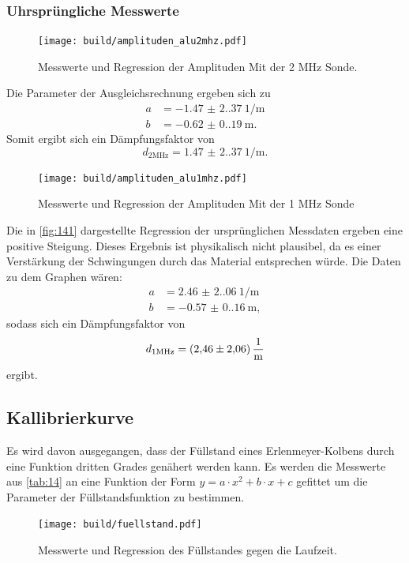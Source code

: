 \subsubsection{Uhrsprüngliche Messwerte}
\begin{figure}[H]
    \centering
    \caption{Messwerte und Regression der Amplituden Mit der 2 $\unit{\mega\hertz}$ Sonde.}
    \label{fig:131}
    \texttt{[image: build/amplituden\_alu2mhz.pdf]}
\end{figure}
\noindent Die Parameter der Ausgleichsrechnung ergeben sich zu 
\begin{align*}
    a &= \qty{-1.47(2.37)}{1 \per\meter}\\
    b &= \qty{-0.62(0.19)}{\meter}.
\end{align*}
Somit ergibt sich ein Dämpfungsfaktor von 
\begin{equation}
    d_{2 \unit{\mega\hertz}} = \qty{1.47(2.37)}{1 \per\meter}.
\end{equation}

\begin{figure}[H]
    \centering
    \caption{Messwerte und Regression der Amplituden Mit der 1 $\unit{\mega\hertz}$ Sonde }
    \label{fig:141}
    \texttt{[image: build/amplituden\_alu1mhz.pdf]}
\end{figure}
\noindent Die in \autoref{fig:141} dargestellte Regression
der ursprünglichen Messdaten ergeben eine positive Steigung. Dieses Ergebnis
ist physikalisch nicht plausibel, da es einer Verstärkung der Schwingungen
durch das Material entsprechen würde.
Die Daten zu dem Graphen wären:
\begin{align*}
    a &= \qty{2.46(2.06)}{1 \per\meter}\\
    b &= \qty{-0.57(0.16)}{\meter},
\end{align*}
sodass sich ein Dämpfungsfaktor von 
\begin{equation}
    d_{1 \unit{\mega\hertz}} = \qty{2.46 \pm 2.06}{\per\meter}
\end{equation}
ergibt.

\subsection{Kallibrierkurve}
Es wird davon ausgegangen, dass der Füllstand eines Erlenmeyer-Kolbens durch
eine Funktion dritten Grades genähert werden kann. Es werden die Messwerte 
aus \autoref{tab:14} an eine Funktion der Form $y = a \cdot x^2 + b \cdot x + c $ gefittet 
um die Parameter der Füllstandsfunktion zu bestimmen. 
\begin{figure}[H]
    \centering
    \caption{Messwerte und Regression des Füllstandes gegen die Laufzeit.}
    \label{fig:15}
    \texttt{[image: build/fuellstand.pdf]}
\end{figure}

